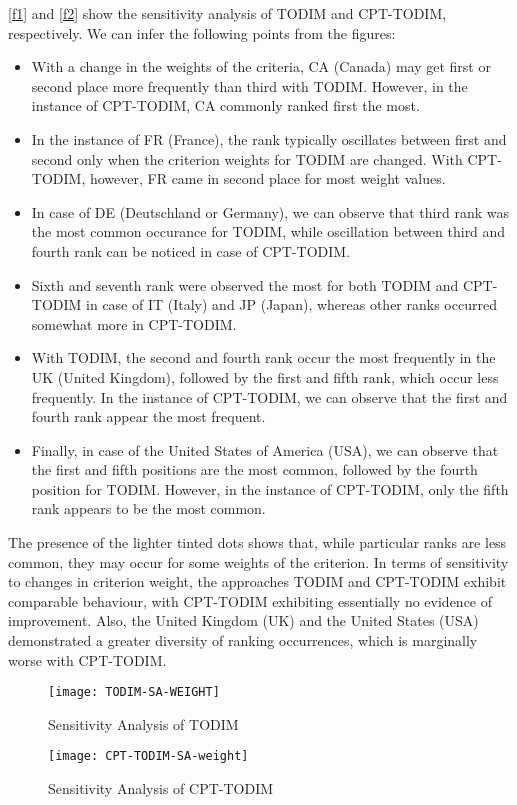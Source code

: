 \documentclass{infor}
\theoremstyle{remark}
\begin{document}
\autoref{f1} and \autoref{f2} show the sensitivity analysis of TODIM and CPT-TODIM, respectively. We can infer the following points from the figures:

\begin{itemize}

    \item With a change in the weights of the criteria, CA (Canada) may get first or second place more frequently than third with TODIM. However, in the instance of CPT-TODIM, CA commonly ranked first the most.

    \item In the instance of FR (France), the rank typically oscillates between first and second only when the criterion weights for TODIM are changed. With CPT-TODIM, however, FR came in second place for most weight values.

    \item In case of DE (Deutschland or Germany), we can observe that third rank was the most common occurance for TODIM, while oscillation between third and fourth rank can be noticed in case of CPT-TODIM. 

    \item Sixth and seventh rank were observed the most for both TODIM and CPT-TODIM in case of IT (Italy) and JP (Japan), whereas other ranks occurred somewhat more in CPT-TODIM.

    \item With TODIM, the second and fourth rank occur the most frequently in the UK (United Kingdom), followed by the first and fifth rank, which occur less frequently. In the instance of CPT-TODIM, we can observe that the first and fourth rank appear the most frequent.

    \item Finally, in case of the United States of America (USA), we can observe that the first and fifth positions are the most common, followed by the fourth position for TODIM. However, in the instance of CPT-TODIM, only the fifth rank appears to be the most common.

\end{itemize}

The presence of the lighter tinted dots shows that, while particular ranks are less common, they may occur for some weights of the criterion. In terms of sensitivity to changes in criterion weight, the approaches TODIM and CPT-TODIM exhibit comparable behaviour, with CPT-TODIM exhibiting essentially no evidence of improvement. Also, the United Kingdom (UK) and the United States (USA) demonstrated a greater diversity of ranking occurrences, which is marginally worse with CPT-TODIM.
\begin{figure}[H]
\texttt{[image: TODIM-SA-WEIGHT]}
\caption{Sensitivity Analysis of TODIM}\label{f1}
\end{figure}
\begin{figure}[!hbt]
\texttt{[image: CPT-TODIM-SA-weight]}
\caption{Sensitivity Analysis of CPT-TODIM}\label{f2}
\end{figure}
\end{document}
